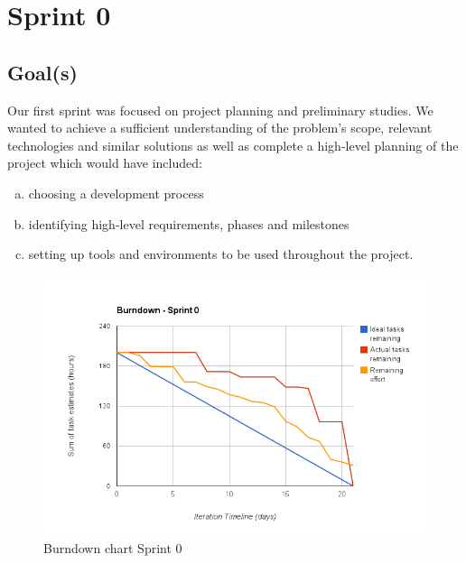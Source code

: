 
\chapter{Sprint 0}
\label{Sprint0}

\section{Goal(s)}

Our first sprint was focused on project planning and preliminary studies.
We wanted to achieve a sufficient understanding of the problem's scope,
relevant technologies and similar solutions as well as complete a high-level planning of
the project which would have included:
\begin{enumerate}[a)]
\item choosing a development process
\item identifying high-level requirements, phases and milestones
\item setting up tools and environments to be used throughout the project.
\end{enumerate}

\begin{figure}[h]
\centering
\includegraphics[scale=0.60]{../Figures/burndownSprint0.png}
\caption{Burndown chart Sprint 0}
\label{figure:burndownsprint0}
\end{figure}

